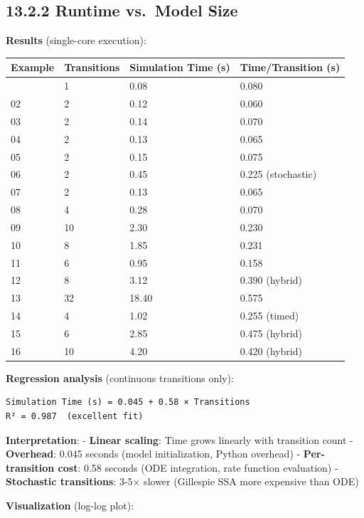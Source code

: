 \hypertarget{runtime-vs.-model-size}{%
\subsection{13.2.2 Runtime vs.~Model
Size}\label{runtime-vs.-model-size}}

\textbf{Results} (single-core execution):

\begin{longtable}[]{@{}llll@{}}
\toprule\noalign{}
Example & Transitions & Simulation Time (s) & Time/Transition (s) \\
\midrule\noalign{}
\endhead
\bottomrule\noalign{}
\endlastfoot
01 & 1 & 0.08 & 0.080 \\
02 & 2 & 0.12 & 0.060 \\
03 & 2 & 0.14 & 0.070 \\
04 & 2 & 0.13 & 0.065 \\
05 & 2 & 0.15 & 0.075 \\
06 & 2 & 0.45 & 0.225 (stochastic) \\
07 & 2 & 0.13 & 0.065 \\
08 & 4 & 0.28 & 0.070 \\
09 & 10 & 2.30 & 0.230 \\
10 & 8 & 1.85 & 0.231 \\
11 & 6 & 0.95 & 0.158 \\
12 & 8 & 3.12 & 0.390 (hybrid) \\
13 & 32 & 18.40 & 0.575 \\
14 & 4 & 1.02 & 0.255 (timed) \\
15 & 6 & 2.85 & 0.475 (hybrid) \\
16 & 10 & 4.20 & 0.420 (hybrid) \\
\end{longtable}

\textbf{Regression analysis} (continuous transitions only):

\begin{lstlisting}
Simulation Time (s) = 0.045 + 0.58 × Transitions
R² = 0.987  (excellent fit)
\end{lstlisting}

\textbf{Interpretation}: - \textbf{Linear scaling}: Time grows linearly
with transition count - \textbf{Overhead}: 0.045 seconds (model
initialization, Python overhead) - \textbf{Per-transition cost}: 0.58
seconds (ODE integration, rate function evaluation) - \textbf{Stochastic
transitions}: 3-5× slower (Gillespie SSA more expensive than ODE)

\textbf{Visualization} (log-log plot):

